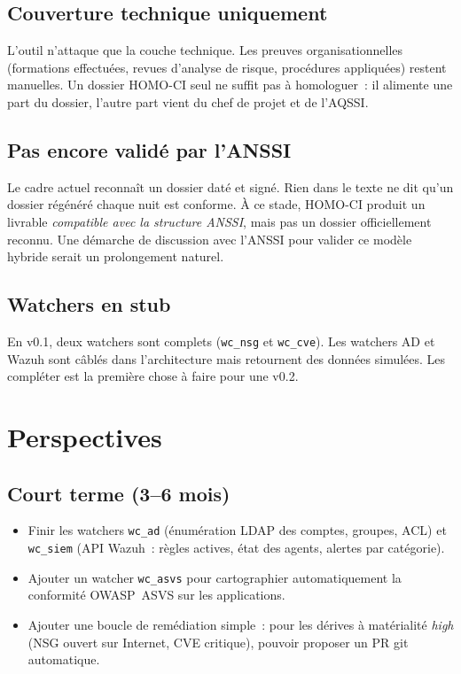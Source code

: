 \subsection{Couverture technique uniquement}

L'outil n'attaque que la couche technique. Les preuves
organisationnelles (formations effectuées, revues d'analyse de
risque, procédures appliquées) restent manuelles. Un dossier
HOMO-CI seul ne suffit pas à homologuer~: il alimente une part
du dossier, l'autre part vient du chef de projet et de l'AQSSI.

\subsection{Pas encore validé par l'ANSSI}

Le cadre actuel reconnaît un dossier daté et signé. Rien dans le
texte ne dit qu'un dossier régénéré chaque nuit est conforme. À
ce stade, HOMO-CI produit un livrable \emph{compatible avec la
structure ANSSI}, mais pas un dossier officiellement reconnu.
Une démarche de discussion avec l'ANSSI pour valider ce modèle
hybride serait un prolongement naturel.

\subsection{Watchers en stub}

En v0.1, deux watchers sont complets (\texttt{wc\_nsg} et
\texttt{wc\_cve}). Les watchers AD et Wazuh sont câblés dans
l'architecture mais retournent des données simulées. Les
compléter est la première chose à faire pour une v0.2.

\section{Perspectives}

\subsection{Court terme (3--6 mois)}

\begin{itemize}
  \item Finir les watchers \texttt{wc\_ad} (énumération LDAP des
    comptes, groupes, ACL) et \texttt{wc\_siem} (API Wazuh~:
    règles actives, état des agents, alertes par catégorie).
  \item Ajouter un watcher \texttt{wc\_asvs} pour cartographier
    automatiquement la conformité OWASP~ASVS sur les
    applications.
  \item Ajouter une boucle de remédiation simple~: pour les
    dérives à matérialité \emph{high} (NSG ouvert sur Internet,
    CVE critique), pouvoir proposer un PR git automatique.
\end{itemize}

